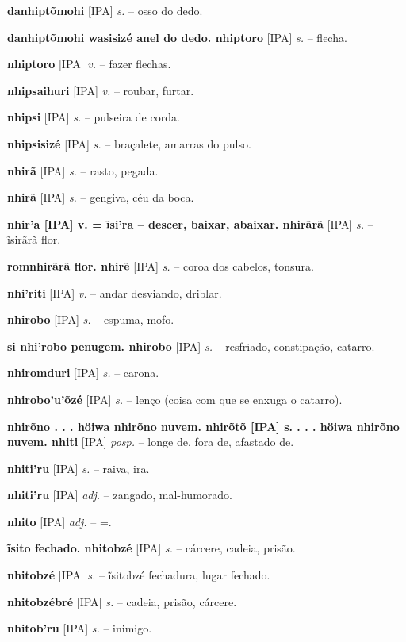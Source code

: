 \textbf{danhiptõmohi} [IPA] \textit{s.} -- osso do dedo. \href{https://xavante.pythonanywhere.com/static/dicionario/play.html?file=finger.wav}{\faHeadphones}

\textbf{danhiptõmohi wasisizé anel do dedo. nhiptoro} [IPA] \textit{s.} -- flecha.

\textbf{nhiptoro} [IPA] \textit{v.} -- fazer flechas.

\textbf{nhipsaihuri} [IPA] \textit{v.} -- roubar, furtar.

\textbf{nhipsi} [IPA] \textit{s.} -- pulseira de corda.

\textbf{nhipsisizé} [IPA] \textit{s.} -- braçalete, amarras do pulso.

\textbf{nhirã} [IPA] \textit{s.} -- rasto, pegada.

\textbf{nhirã} [IPA] \textit{s.} -- gengiva, céu da boca.

\textbf{nhir'a [IPA] v. = ĩsi'ra -- descer, baixar, abaixar. nhirãrã} [IPA] \textit{s.} -- ĩsirãrã flor.

\textbf{romnhirãrã flor. nhirẽ} [IPA] \textit{s.} -- coroa dos cabelos, tonsura.

\textbf{nhi'riti} [IPA] \textit{v.} -- andar desviando, driblar.

\textbf{nhirobo} [IPA] \textit{s.} -- espuma, mofo.

\textbf{si nhi'robo penugem. nhirobo} [IPA] \textit{s.} -- resfriado, constipação, catarro.

\textbf{nhiromduri} [IPA] \textit{s.} -- carona.

\textbf{nhirobo'u'õzé} [IPA] \textit{s.} -- lenço (coisa com que se enxuga o catarro).

\textbf{nhirõno . . .  höiwa nhirõno nuvem. nhirõtõ [IPA] s. . . .  höiwa nhirõno nuvem. nhiti} [IPA] \textit{posp.} -- longe de, fora de, afastado de.

\textbf{nhiti'ru} [IPA] \textit{s.} -- raiva, ira.

\textbf{nhiti'ru} [IPA] \textit{adj.} -- zangado, mal-humorado.

\textbf{nhito} [IPA] \textit{adj.} -- =.

\textbf{ĩsito fechado. nhitobzé} [IPA] \textit{s.} -- cárcere, cadeia, prisão.

\textbf{nhitobzé} [IPA] \textit{s.} -- ĩsitobzé fechadura, lugar fechado.

\textbf{nhitobzébré} [IPA] \textit{s.} -- cadeia, prisão, cárcere.

\textbf{nhitob'ru} [IPA] \textit{s.} -- inimigo.

